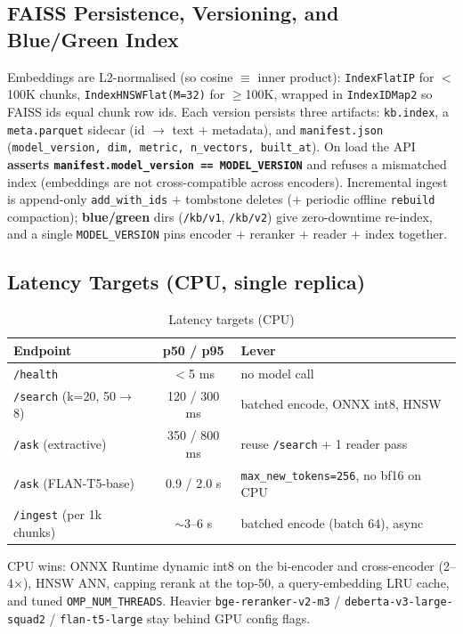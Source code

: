 \documentclass[12pt,a4paper]{article}
\begin{document}
\subsection{FAISS Persistence, Versioning, and Blue/Green Index}

Embeddings are L2-normalised (so cosine $\equiv$ inner product): \texttt{IndexFlatIP} for $<$100K chunks, \texttt{IndexHNSWFlat(M=32)} for $\geq$100K, wrapped in \texttt{IndexIDMap2} so FAISS ids equal chunk row ids. Each version persists three artifacts: \texttt{kb.index}, a \texttt{meta.parquet} sidecar (id $\rightarrow$ text $+$ metadata), and \texttt{manifest.json} (\texttt{model\_version, dim, metric, n\_vectors, built\_at}). On load the API \textbf{asserts \texttt{manifest.model\_version == MODEL\_VERSION}} and refuses a mismatched index (embeddings are not cross-compatible across encoders). Incremental ingest is append-only \texttt{add\_with\_ids} $+$ tombstone deletes ($+$ periodic offline \texttt{rebuild} compaction); \textbf{blue/green} dirs (\texttt{/kb/v1}, \texttt{/kb/v2}) give zero-downtime re-index, and a single \texttt{MODEL\_VERSION} pins encoder $+$ reranker $+$ reader $+$ index together.

\subsection{Latency Targets (CPU, single replica)}

\begin{table}[H]
\centering
\caption{Latency targets (CPU)}
\begin{tabular}{lcl}
\toprule
\textbf{Endpoint} & \textbf{p50 / p95} & \textbf{Lever} \\
\midrule
\texttt{/health} & $<$5 ms & no model call \\
\texttt{/search} (k=20, 50$\rightarrow$8) & 120 / 300 ms & batched encode, ONNX int8, HNSW \\
\texttt{/ask} (extractive) & 350 / 800 ms & reuse \texttt{/search} $+$ 1 reader pass \\
\texttt{/ask} (FLAN-T5-base) & 0.9 / 2.0 s & \texttt{max\_new\_tokens=256}, no bf16 on CPU \\
\texttt{/ingest} (per 1k chunks) & $\sim$3--6 s & batched encode (batch 64), async \\
\bottomrule
\end{tabular}
\end{table}

CPU wins: ONNX Runtime dynamic int8 on the bi-encoder and cross-encoder (2--4$\times$), HNSW ANN, capping rerank at the top-50, a query-embedding LRU cache, and tuned \texttt{OMP\_NUM\_THREADS}. Heavier \texttt{bge-reranker-v2-m3} / \texttt{deberta-v3-large-squad2} / \texttt{flan-t5-large} stay behind GPU config flags.
\end{document}
